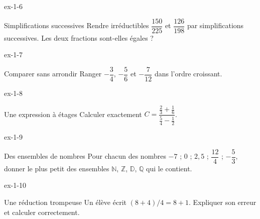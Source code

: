 \clearpage{}
\begin{blocLivre}{ex-1-6}\begin{exercice}[2]{Simplifications successives}
Rendre irréductibles $\dfrac{150}{225}$ et $\dfrac{126}{198}$ par simplifications successives. Les deux fractions sont-elles égales ?
\end{exercice}\end{blocLivre}
\begin{blocLivre}{ex-1-7}\begin{exercice}[2]{Comparer sans arrondir}
Ranger $-\dfrac34$, $-\dfrac56$ et $-\dfrac7{12}$ dans l’ordre croissant.
\end{exercice}\end{blocLivre}
\begin{blocLivre}{ex-1-8}\begin{exercice}[2]{Une expression à étages}
Calculer exactement $C=\dfrac{\frac23+\frac16}{\frac54-\frac12}$.
\end{exercice}\end{blocLivre}
\begin{blocLivre}{ex-1-9}\begin{exercice}[2]{Des ensembles de nombres}
Pour chacun des nombres $-7$ ; $0$ ; $2{,}5$ ; $\dfrac{12}{4}$ ; $-\dfrac53$, donner le plus petit des ensembles $\mathbb N$, $\mathbb Z$, $\mathbb D$, $\mathbb Q$ qui le contient.
\end{exercice}\end{blocLivre}
\begin{blocLivre}{ex-1-10}\begin{exercice}[2]{Une réduction trompeuse}
Un élève écrit $(8+4)/4=8+1$. Expliquer son erreur et calculer correctement.
\end{exercice}\end{blocLivre}


